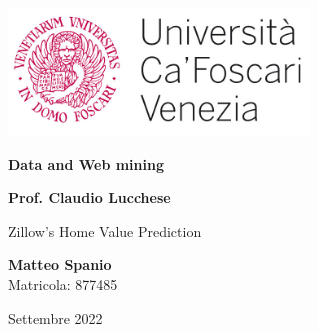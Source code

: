 \begin{titlepage}
    \begin{center}
        \includegraphics[width=0.6\textwidth]{img/long_logo.jpg}
        
        \vspace{2.5cm}
        \Huge
        \textbf{Data and Web mining}
 
        \vspace{0.5cm}
        \LARGE
 
        \vspace{1cm}
 
        \textbf{Prof. Claudio Lucchese}
 
        \vfill
 
        Zillow’s Home Value Prediction
        
        \vfill

        \textbf{Matteo Spanio}\\
        {Matricola: 877485}
 

        \vspace{0.8cm}
        \Large
        Settembre 2022
 
    \end{center}
\end{titlepage}
